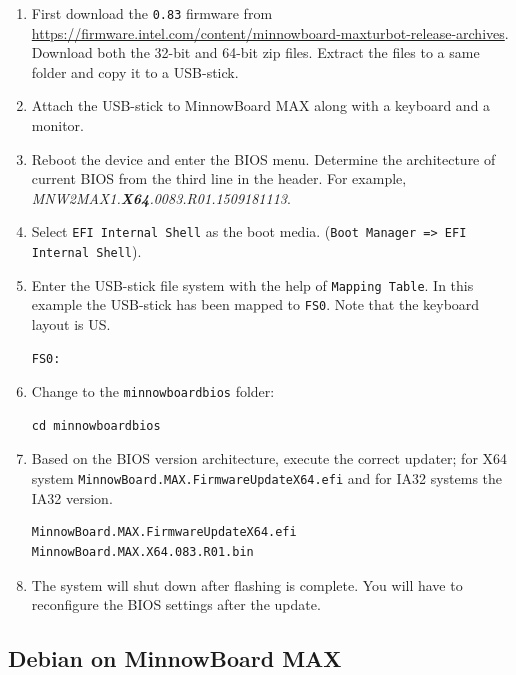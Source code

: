 \documentclass[a4paper,11pt]{article}
\newcommand{\cmd}[1]{\texttt{#1}}
\begin{document}
\begin{enumerate}
\item First download the \cmd{0.83} firmware from \url{https://firmware.intel.com/content/minnowboard-maxturbot-release-archives}. Download both the 32-bit and 64-bit zip files. Extract the files to a same folder and copy it to a USB-stick.

\item Attach the USB-stick to MinnowBoard MAX along with a keyboard and a monitor.

\item Reboot the device and enter the BIOS menu. Determine the architecture of current BIOS from the third line in the header. For example, \textit{MNW2MAX1.\textbf{X64}.0083.R01.1509181113}.

\item Select \cmd{EFI Internal Shell} as the boot media. (\cmd{Boot Manager => EFI Internal Shell}).

\item Enter the USB-stick file system with the help of \cmd{Mapping Table}. In this example the USB-stick has been mapped to \cmd{FS0}. Note that the keyboard layout is US.
\begin{lstlisting}
FS0:
\end{lstlisting}

\item Change to the \cmd{minnowboardbios} folder:
\begin{lstlisting}
cd minnowboardbios
\end{lstlisting}

\item Based on the BIOS version architecture, execute the correct updater; for X64 system \cmd{MinnowBoard.MAX.FirmwareUpdateX64.efi} and for IA32 systems the IA32 version.
\begin{lstlisting}
MinnowBoard.MAX.FirmwareUpdateX64.efi MinnowBoard.MAX.X64.083.R01.bin
\end{lstlisting}

\item The system will shut down after flashing is complete. You will have to reconfigure the BIOS settings after the update.
\end{enumerate}

\subsection{Debian on MinnowBoard MAX}
\label{minnowdebian}
\end{document}
